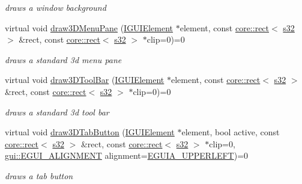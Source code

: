 \begin{DoxyCompactItemize}
\begin{DoxyCompactList}\small\item\em draws a window background \end{DoxyCompactList}\item 
virtual void \hyperlink{classirr_1_1gui_1_1IGUISkin_a1fce02fb3795fc5e71e775a6396fe0eb}{draw3\+D\+Menu\+Pane} (\hyperlink{classirr_1_1gui_1_1IGUIElement}{I\+G\+U\+I\+Element} $\ast$element, const \hyperlink{classirr_1_1core_1_1rect}{core\+::rect}$<$ \hyperlink{namespaceirr_ac66849b7a6ed16e30ebede579f9b47c6}{s32} $>$ \&rect, const \hyperlink{classirr_1_1core_1_1rect}{core\+::rect}$<$ \hyperlink{namespaceirr_ac66849b7a6ed16e30ebede579f9b47c6}{s32} $>$ $\ast$clip=0)=0
\begin{DoxyCompactList}\small\item\em draws a standard 3d menu pane \end{DoxyCompactList}\item 
virtual void \hyperlink{classirr_1_1gui_1_1IGUISkin_a8510de5c6bcd0dae99b9b77ac39aba6b}{draw3\+D\+Tool\+Bar} (\hyperlink{classirr_1_1gui_1_1IGUIElement}{I\+G\+U\+I\+Element} $\ast$element, const \hyperlink{classirr_1_1core_1_1rect}{core\+::rect}$<$ \hyperlink{namespaceirr_ac66849b7a6ed16e30ebede579f9b47c6}{s32} $>$ \&rect, const \hyperlink{classirr_1_1core_1_1rect}{core\+::rect}$<$ \hyperlink{namespaceirr_ac66849b7a6ed16e30ebede579f9b47c6}{s32} $>$ $\ast$clip=0)=0
\begin{DoxyCompactList}\small\item\em draws a standard 3d tool bar \end{DoxyCompactList}\item 
virtual void \hyperlink{classirr_1_1gui_1_1IGUISkin_a9e7027309a52d17554be984554134426}{draw3\+D\+Tab\+Button} (\hyperlink{classirr_1_1gui_1_1IGUIElement}{I\+G\+U\+I\+Element} $\ast$element, bool active, const \hyperlink{classirr_1_1core_1_1rect}{core\+::rect}$<$ \hyperlink{namespaceirr_ac66849b7a6ed16e30ebede579f9b47c6}{s32} $>$ \&rect, const \hyperlink{classirr_1_1core_1_1rect}{core\+::rect}$<$ \hyperlink{namespaceirr_ac66849b7a6ed16e30ebede579f9b47c6}{s32} $>$ $\ast$clip=0, \hyperlink{namespaceirr_1_1gui_a19eb5fb40e67f108cb16aba922ddaa2d}{gui\+::\+E\+G\+U\+I\+\_\+\+A\+L\+I\+G\+N\+M\+E\+NT} alignment=\hyperlink{namespaceirr_1_1gui_a19eb5fb40e67f108cb16aba922ddaa2da4bb8a01452727274e18047a872da1809}{E\+G\+U\+I\+A\+\_\+\+U\+P\+P\+E\+R\+L\+E\+FT})=0
\begin{DoxyCompactList}\small\item\em draws a tab button \end{DoxyCompactList}\item 

\end{DoxyCompactItemize}
